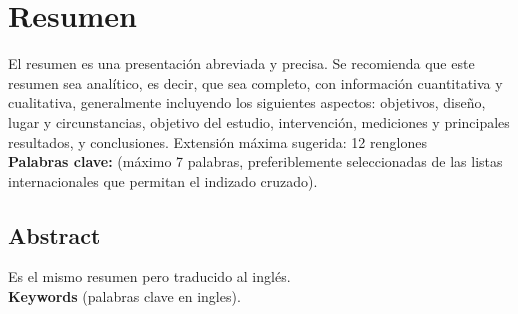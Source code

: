 \chapter*{Resumen}

El resumen es una presentación abreviada y precisa. Se recomienda que este resumen sea analítico, es decir, que sea completo, con información cuantitativa y cualitativa, generalmente incluyendo los siguientes aspectos: objetivos, diseño, lugar y circunstancias, objetivo del estudio, intervención, mediciones y principales resultados, y conclusiones. Extensión máxima sugerida: 12 renglones\\

\textbf{Palabras clave:} (máximo 7 palabras, preferiblemente seleccionadas de las listas internacionales que permitan el indizado cruzado). 

\section*{Abstract}

Es el mismo resumen pero traducido al inglés.\\

\textbf{Keywords} (palabras clave en ingles). 


 
